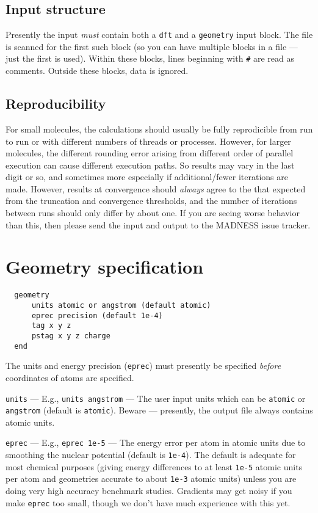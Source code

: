 \documentclass[letterpaper]{book}
\begin{document}
\section{Input structure}

Presently the input {\em must} contain both a \verb+dft+ and a
\verb+geometry+ input block.  The file is scanned for the first such
block (so you can have multiple blocks in a file --- just the first is
used). Within these blocks, lines beginning with \verb+#+ are read as comments.
Outside these blocks, data is ignored.

\section{Reproducibility}

For small molecules, the calculations should usually be fully
reprodicible from run to run or with different numbers of threads or
processes.  However, for larger molecules, the different rounding
error arising from different order of parallel execution can cause
different execution paths.  So results may vary in the last digit or
so, and sometimes more especially if additional/fewer iterations are
made.  However, results at convergence should {\em always} agree to
the that expected from the truncation and convergence thresholds, and
the number of iterations between runs should only differ by about one.
If you are seeing worse behavior than this, then please send the input
and output to the MADNESS issue tracker.

\chapter{Geometry specification}

\begin{verbatim}
  geometry
      units atomic or angstrom (default atomic)
      eprec precision (default 1e-4)
      tag x y z
      pstag x y z charge
  end
\end{verbatim}

The units and energy precision ({\tt eprec}) must presently be specified {\em before} coordinates of atoms are specified.

{\tt units} --- E.g., {\tt units angstrom} --- The user input units which can be {\tt atomic} or {\tt angstrom} (default is {\tt atomic}).  Beware --- presently, the output file always contains atomic units.

{\tt eprec} --- E.g., {\tt eprec 1e-5} --- The energy error per atom
in atomic units due to smoothing the nuclear potential (default is
{\tt 1e-4}).  The default is adequate for most chemical purposes
(giving energy differences to at least {\tt 1e-5} atomic units per atom
and geometries accurate to about {\tt 1e-3} atomic units) unless you
are doing very high accuracy benchmark studies.  Gradients may get
noisy if you make {\tt eprec} too small, though we don't have much
experience with this yet. 
\end{document}
